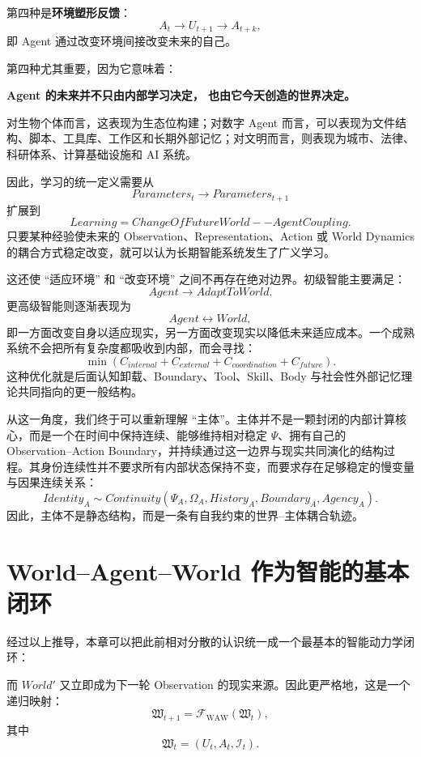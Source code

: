 第四种是\textbf{环境塑形反馈}：
\[
A_t
\rightarrow
U_{t+1}
\rightarrow
A_{t+k},
\]
即 Agent 通过改变环境间接改变未来的自己。

第四种尤其重要，因为它意味着：
\begin{statementbox}
\centering\bfseries
Agent 的未来并不只由内部学习决定，
也由它今天创造的世界决定。
\end{statementbox}
对生物个体而言，这表现为生态位构建；对数字 Agent 而言，可以表现为文件结构、脚本、工具库、工作区和长期外部记忆；对文明而言，则表现为城市、法律、科研体系、计算基础设施和 AI 系统。

因此，学习的统一定义需要从
\[
Parameters_t
\rightarrow
Parameters_{t+1}
\]
扩展到
\[
\boxed{
Learning
=
ChangeOfFutureWorld--AgentCoupling.
}
\]
只要某种经验使未来的 Observation、Representation、Action 或 World Dynamics 的耦合方式稳定改变，就可以认为长期智能系统发生了广义学习。

这还使 ``适应环境'' 和 ``改变环境'' 之间不再存在绝对边界。初级智能主要满足：
\[
Agent\rightarrow AdaptToWorld.
\]
更高级智能则逐渐表现为
\[
Agent\leftrightarrow World,
\]
即一方面改变自身以适应现实，另一方面改变现实以降低未来适应成本。一个成熟系统不会把所有复杂度都吸收到内部，而会寻找：
\[
\min
\left(
C_{internal}
+
C_{external}
+
C_{coordination}
+
C_{future}
\right).
\]
这种优化就是后面认知卸载、Boundary、Tool、Skill、Body 与社会性外部记忆理论共同指向的更一般结构。

从这一角度，我们终于可以重新理解 ``主体''。主体并不是一颗封闭的内部计算核心，而是一个在时间中保持连续、能够维持相对稳定 $\Psi$、拥有自己的 Observation--Action Boundary，并持续通过这一边界与现实共同演化的结构过程。其身份连续性并不要求所有内部状态保持不变，而要求存在足够稳定的慢变量与因果连续关系：
\[
Identity_A
\sim
Continuity
\left(
\Psi_A,
\Omega_A,
History_A,
Boundary_A,
Agency_A
\right).
\]
因此，主体不是静态结构，而是一条有自我约束的世界--主体耦合轨迹。


\section{World--Agent--World 作为智能的基本闭环}

经过以上推导，本章可以把此前相对分散的认识统一成一个最基本的智能动力学闭环：
\begin{statementbox}
\centering
{}
\end{statementbox}
而 $World'$ 又立即成为下一轮 Observation 的现实来源。因此更严格地，这是一个递归映射：
\[
\mathfrak W_{t+1}
=
\mathcal F_{\mathrm{WAW}}
\left(
\mathfrak W_t
\right),
\]
其中
\[
\mathfrak W_t
=
\left(
U_t,A_t,\mathcal I_t
\right).
\]

